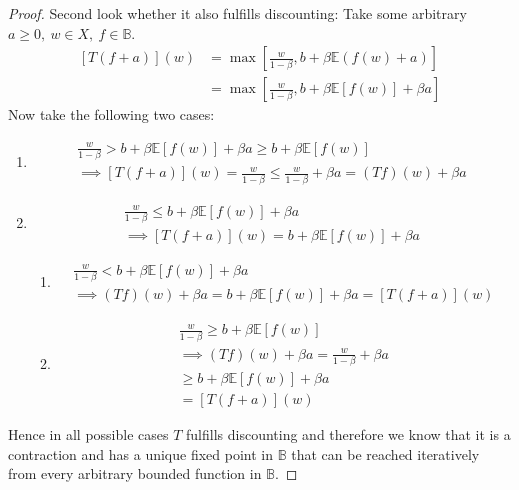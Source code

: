 \begin{proof}
  Second look whether it also fulfills discounting: Take some arbitrary $a \geq
  0,~w \in X,~f \in \mathbb{B}$.
  \begin{align*}
    \left[T(f + a)\right] (w) &= \max \left[ \frac{w}{1 - \beta}, b + \beta
                                \mathbb{E} (f(w) + a)\right] \\
                              &= \max \left[ \frac{w}{1 - \beta}, b + \beta
                                \mathbb{E} \left[f(w)\right] + \beta a\right]
  \end{align*}
  Now take the following two cases:
  \begin{enumerate}
  \item
    \begin{align*}
      \frac{w}{1 - \beta} > b + \beta \mathbb{E} \left[f(w)\right] + \beta a
      \geq b + \beta \mathbb{E} \left[f(w)\right] \\
      \implies \left[T(f + a)\right] (w) = \frac{w}{1 - \beta} \leq \frac{w}{1
      - \beta} + \beta a = (Tf)(w) + \beta a
    \end{align*}
  \item
    \begin{align*}
      \frac{w}{1 - \beta} \leq b + \beta \mathbb{E} \left[f(w)\right] + \beta a
      \\
      \implies \left[T(f + a)\right](w) = b + \beta \mathbb{E} \left[f(w)\right] + \beta a
    \end{align*}
    \begin{enumerate}
    \item
      \begin{align*}
        \frac{w}{1 - \beta} < b + \beta \mathbb{E} \left[f(w)\right] + \beta a
        \\
        \implies (Tf)(w) + \beta a = b + \beta \mathbb{E} \left[f(w)\right] +
        \beta a = \left[T(f + a)\right](w)
      \end{align*}
    \item
      \begin{align*}
        \frac{w}{1 - \beta} \geq b + \beta \mathbb{E} \left[f(w)\right] \\
        \implies (Tf)(w) + \beta a = \frac{w}{1 - \beta} + \beta a \\
        \geq b + \beta \mathbb{E} \left[f(w)\right] + \beta a \\
        = \left[T(f + a)\right] (w)
      \end{align*}
    \end{enumerate}
  \end{enumerate}
  Hence in all possible cases $T$ fulfills discounting and therefore we know
  that it is a contraction and has a unique fixed point in $\mathbb{B}$ that
  can be reached iteratively from every arbitrary bounded function in
  $\mathbb{B}$. 
\end{proof}

